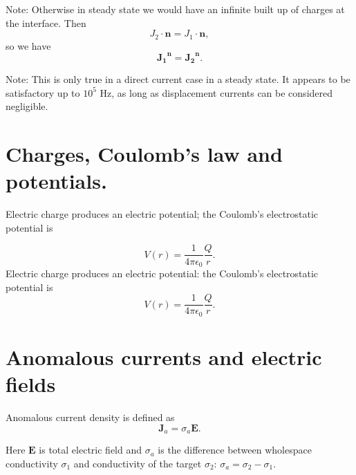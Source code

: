 \documentclass[11pt,letterpaper,leqno]{amsart}
\numberwithin{equation}{section}
\begin{document}
Note: Otherwise in steady state we would have an infinite built up of charges at the interface. 
Then 
\begin{equation} 
J_2 \cdot \mathbf{n} = J_1 \cdot \mathbf{n},
 \end{equation}
so we have 
\begin{equation}
\mathbf{{J_1}^n={J_2}^n}.
\end{equation}


Note: This is only true in a direct current case in a steady state. It appears to be satisfactory up to $10^5$ Hz, as long as displacement currents can be considered negligible.


\section{Charges, Coulomb's law and potentials.}


Electric charge produces an electric potential; the Coulomb's electrostatic potential is

\begin{equation}
V(r) = \frac{1}{4\pi\epsilon_0}\frac{Q}{r}.
\end{equation}
Electric charge produces an electric potential: the Coulomb's electrostatic potential is
\begin{equation}
V(r) = \frac{1}{4\pi\epsilon_0}\frac{Q}{r}.
\end{equation}



\section{Anomalous currents and electric fields}

Anomalous current density is defined as 
\begin{equation}
\mathbf{J}_a = \sigma_a\mathbf{E}.
\end{equation}


Here $\mathbf{E}$ is total electric field and $\sigma_a$ is the difference between wholespace conductivity $\sigma_1$ and conductivity of the target $\sigma_2$: $\sigma_a = \sigma_2-\sigma_1$.




 \vspace{0.4cm}
\end{document}
